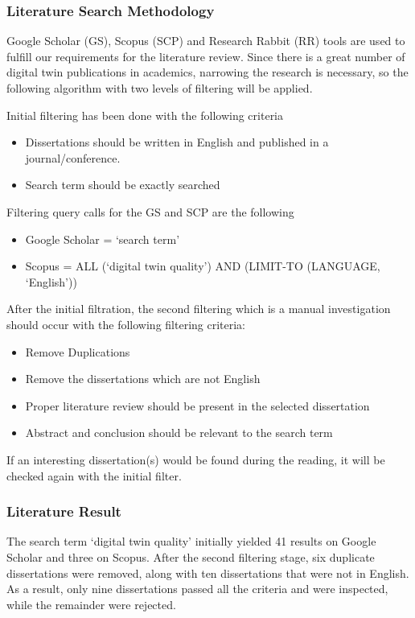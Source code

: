 \documentclass{llncs}
\begin{document}
    \subsubsection*{Literature Search Methodology}
    Google Scholar (GS), Scopus (SCP) and Research Rabbit (RR) tools are used to fulfill our requirements for the literature review. Since there is a great number of digital twin publications in academics,
    narrowing the research is necessary, so the following algorithm with two levels of filtering will be applied.

    Initial filtering has been done with the following criteria
    \begin{itemize}
        \item  Dissertations should be written in English and published in a journal/conference.
        \item  Search term should be exactly searched
    \end{itemize}
    Filtering query calls for the GS and SCP are the following
    \begin{itemize}
        \item Google Scholar = `search term'
        \item Scopus = ALL (`digital twin quality') AND (LIMIT-TO (LANGUAGE, `English'))
    \end{itemize}
    After the initial filtration, the second filtering which is a manual investigation should occur with the following filtering criteria:
    \begin{itemize}
        \item  Remove Duplications
        \item  Remove the dissertations which are not English
        \item  Proper literature review should be present in the selected dissertation
        \item  Abstract and conclusion should be relevant to the search term
    \end{itemize}

    If an interesting dissertation(s) would be found during the reading, it will be checked again with the initial filter.

    \subsubsection*{Literature Result}
    The search term `digital twin quality' initially yielded 41 results on Google Scholar and three on Scopus. 
    After the second filtering stage, six duplicate dissertations were removed, along with ten dissertations that were not in English. As a result, only nine dissertations passed all the criteria and were inspected, while the remainder were rejected.
    
\end{document}
